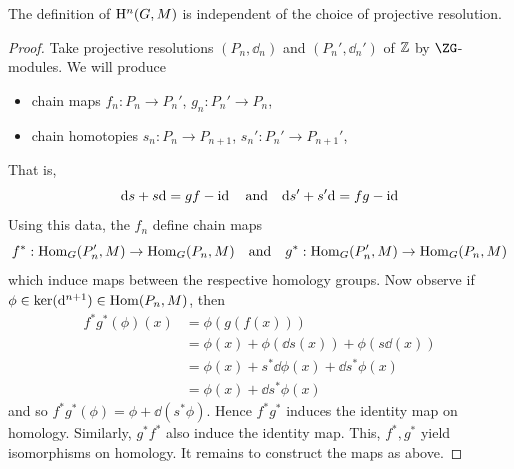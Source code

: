 \documentclass{article}
\begin{document}
\begin{theorem}
    The definition of \(\mathrm{H}^n(G, M)\) is independent of the choice of projective resolution.
\end{theorem}

\begin{proof}
    Take projective resolutions \((P_n, \dd_n)\) and \((P_n', \dd_n')\) of \(\mathbb{Z}\) by \(\ZG\)-modules. We will produce 
    \begin{itemize}
        \item chain maps \(f_n : P_n \to P_n'\), \(g_n : P_n' \to P_n\),
        \item chain homotopies \(s_n : P_n \to P_{n+1}\), \(s_n' : P_n' \to P_{n+1}'\),
    \end{itemize}
    That is,
    \[\dd s + s \dd = gf - \id \qqtext{and}\dd s' + s'\dd = fg - \id\]
    Using this data, the \(f_n\) define chain maps
    \[f^* : \Hom_G(P_n', M) \to \Hom_G(P_n, M) \qqtext{and} g^* : \Hom_G(P_n', M) \to \Hom_G(P_n, M)\]
    which induce maps between the respective homology groups. Now observe if \(\phi \in \ker(\dd^{n+1}) \in \operatorname{Hom}(P_n, M)\), then
    \begin{align*}
        f^*g^*(\phi)(x) &= \phi(g(f(x))) \\
        &= \phi(x) + \phi(\dd s(x)) + \phi(s \dd (x)) \\
        &= \phi(x) + s^*\dd\phi(x) + \dd s^*\phi(x) \\
        &= \phi(x) + \dd s^*\phi(x)
    \end{align*}
    and so \(f^*g^*(\phi) = \phi + \dd(s^*\phi)\). Hence \(f^*g^*\) induces the identity map on homology. Similarly, \(g^*f^*\) also induce the identity map. This, \(f^*, g^*\) yield isomorphisms on homology. It remains to construct the maps as above.


\end{proof}
\end{document}
